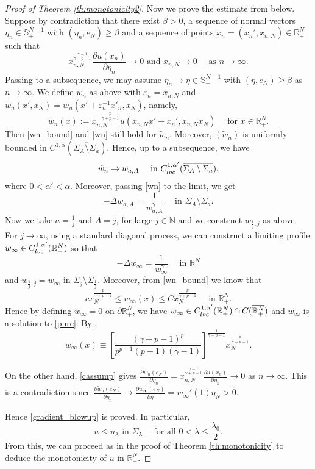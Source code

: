 \documentclass[reqno]{amsart}
\theoremstyle{plain}
\theoremstyle{definition}
\theoremstyle{remark}
\begin{document}
\begin{proof}[Proof of Theorem \ref{th:monotonicity2}]
		Now we prove the estimate from below. Suppose by contradiction that there exist $\beta>0$, a sequence of normal vectors $\eta_n\in \mathbb{S}^{N-1}_+$ with $(\eta_n,e_N) \ge \beta$ and a sequence of points $x_n=(x_n', x_{n,N})\in\mathbb{R}^N_+$ such that
		\begin{equation}\label{cassump}
			x_{n,N}^{\frac{\gamma-1}{\gamma+p-1}} \frac{\partial u(x_n)}{\partial \eta_n} \to 0 \text{ and } x_{n,N} \to 0 \quad\text{ as } n\to\infty.
		\end{equation}
		Passing to a subsequence, we may assume $\eta_n\to\eta\in \mathbb{S}^{N-1}_+$ with $(\eta,e_N) \ge \beta$ as $n\to\infty$.
		We define $w_n$ as above with $\varepsilon_n=x_{n,N}$ and $\tilde w_n(x',x_N)=w_n(x'+\varepsilon_n^{-1}x'_n,x_N)$, namely,
		\[
		\tilde w_n(x) := x_{n,N}^{-\frac{p}{\gamma+p-1}} u(x_{n,N} x'+x_n', x_{n,N} x_N) \quad\text{ for } x \in \mathbb{R}^N_+.
		\]
		Then \eqref{wn_bound} and \eqref{wn} still hold for $\tilde w_n$.
		Moreover, $(\tilde w_n)$ is uniformly bounded in $C^{1,\alpha}(\overline{\Sigma_A\setminus \Sigma_a})$. Hence, up to a subsequence, we have
		\[
		\tilde w_n \to w_{a,A} \quad\text{ in } C^{1,\alpha'}_{\rm loc}(\overline{\Sigma_A\setminus \Sigma_a}),
		\]
		where $0<\alpha'<\alpha$.
		Moreover, passing \eqref{wn} to the limit, we get
		\[
		-\Delta w_{a,A} = \frac{1}{w_{a,A}^\gamma} \quad\text{ in } \Sigma_A\setminus \Sigma_a.
		\]
		Now we take $a = \frac{1}{j}$ and $A = j$, for large $j \in \mathbb{N}$ and we construct $w_{\frac{1}{j},j}$ as above. For $j\to\infty$, using a standard diagonal process, we can construct a limiting profile $w_\infty \in C^{1,\alpha'}_{\rm loc}(\mathbb{R}^N_+)$ so that
		\[
		-\Delta w_\infty = \frac{1}{w_\infty^\gamma} \quad\text{ in } \mathbb{R}^N_+
		\]
		and $w_{\frac{1}{j},j} = w_\infty$ in $\Sigma_j\setminus \Sigma_{\frac{1}{j}}$. Moreover, from \eqref{wn_bound} we know that
		\[
		c x_N^\frac{p}{\gamma+p-1} \le w_\infty(x) \le C x_N^\frac{p}{\gamma+p-1} \quad\text{ in } \mathbb{R}^N_+.
		\]
		Hence by defining $w_\infty=0$ on $\partial\mathbb{R}^N_+$, we have $w_\infty \in C^{1,\alpha'}_{\rm loc}(\mathbb{R}^N_+)\cap C(\overline{\mathbb{R}^N_+})$ and $w_\infty$ is a solution to \eqref{pure}.
		By \cite[Theorem 1.2]{MR4044739},
		\[
		w_\infty(x) \equiv \left[\frac{(\gamma+p-1)^p}{p^{p-1}(p-1)(\gamma-1)}\right]^\frac{1}{\gamma+p-1}	x_N^\frac{p}{\gamma+p-1}.
		\]
		
		On the other hand, \eqref{cassump} gives $\frac{\partial \tilde w_n(e_N)}{\partial \eta_n} = x_{n,N}^\frac{\gamma-1}{\gamma+p+1} \frac{\partial u(x_n)}{\partial \eta_n} \to 0$ as $n \to \infty$. This is a contradiction since $\frac{\partial \tilde w_n(e_N)}{\partial \eta_n} \to \frac{\partial w_\infty(e_N)}{\partial \eta}=w_\infty'(1)\eta_N>0$.
		
		Hence \eqref{gradient_blowup} is proved. In particular,
		\[
		u\leq u_\lambda \text{ in } \Sigma_\lambda \quad\text{ for all } 0<\lambda\leq\frac{\lambda_0}{2}.
		\]
		From this, we can proceed as in the proof of Theorem \ref{th:monotonicity} to deduce the monotonicity of $u$ in $\mathbb{R}^N_+$.
	\end{proof}
	
\end{document}

